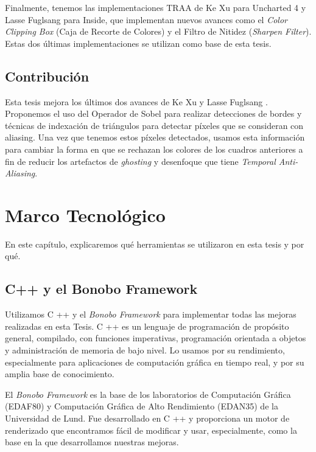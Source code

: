 \documentclass{cslthse-msc}
\begin{document}
Finalmente, tenemos las implementaciones TRAA de Ke Xu para Uncharted 4 y Lasse Fuglsang para Inside, que implementan nuevos avances como el \textit{Color Clipping Box} (Caja de Recorte de Colores) y el Filtro de Nitidez (\textit{Sharpen Filter}). Estas dos últimas implementaciones se utilizan como base de esta tesis. \cite{Fuglsand2016, XU2016}


\section{Contribución}
Esta tesis mejora los últimos dos avances de Ke Xu y Lasse Fuglsang \cite{Fuglsand2016, XU2016}. Proponemos el uso del Operador de Sobel para realizar detecciones de bordes y técnicas de indexación de triángulos para detectar píxeles que se consideran con aliasing. Una vez que tenemos estos píxeles detectados, usamos esta información para cambiar la forma en que se rechazan los colores de los cuadros anteriores a fin de reducir los artefactos de \textit{ghosting} y desenfoque que tiene \textit{Temporal Anti-Aliasing}.

\chapter{Marco Tecnológico}
En este capítulo, explicaremos qué herramientas se utilizaron en esta tesis y por qué.

\section{C++ y el Bonobo Framework}
Utilizamos C ++ y el \textit{Bonobo Framework} para implementar todas las mejoras realizadas en esta Tesis. C ++ es un lenguaje de programación de propósito general, compilado, con funciones imperativas, programación orientada a objetos y administración de memoria de bajo nivel. Lo usamos por su rendimiento, especialmente para aplicaciones de computación gráfica en tiempo real, y por su amplia base de conocimiento.

El \textit{Bonobo Framework} es la base de los laboratorios de Computación Gráfica (EDAF80) y Computación Gráfica de Alto Rendimiento (EDAN35) de la Universidad de Lund. Fue desarrollado en C ++ y proporciona un motor de renderizado que encontramos fácil de modificar y usar, especialmente, como la base en la que desarrollamos nuestras mejoras.
\end{document}
